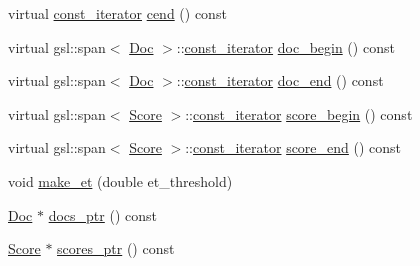 \begin{DoxyCompactItemize}
\item 
virtual \mbox{\hyperlink{structbloodhound_1_1PostingList_1_1const__iterator}{const\+\_\+iterator}} \mbox{\hyperlink{classbloodhound_1_1PostingList_a7eca0ae1f54ddc48757a4fb3c0b885ce}{cend}} () const
\item 
virtual gsl\+::span$<$ \mbox{\hyperlink{structbloodhound_1_1Doc}{Doc}} $>$\+::\mbox{\hyperlink{structbloodhound_1_1PostingList_1_1const__iterator}{const\+\_\+iterator}} \mbox{\hyperlink{classbloodhound_1_1PostingList_aac3dbe7fbf43ce93031e97b16bcfc888}{doc\+\_\+begin}} () const
\item 
virtual gsl\+::span$<$ \mbox{\hyperlink{structbloodhound_1_1Doc}{Doc}} $>$\+::\mbox{\hyperlink{structbloodhound_1_1PostingList_1_1const__iterator}{const\+\_\+iterator}} \mbox{\hyperlink{classbloodhound_1_1PostingList_aac468540b0a376d9b378a4333546245c}{doc\+\_\+end}} () const
\item 
virtual gsl\+::span$<$ \mbox{\hyperlink{structbloodhound_1_1Score}{Score}} $>$\+::\mbox{\hyperlink{structbloodhound_1_1PostingList_1_1const__iterator}{const\+\_\+iterator}} \mbox{\hyperlink{classbloodhound_1_1PostingList_aec5d5bb81622fb64d7b64416a8491456}{score\+\_\+begin}} () const
\item 
virtual gsl\+::span$<$ \mbox{\hyperlink{structbloodhound_1_1Score}{Score}} $>$\+::\mbox{\hyperlink{structbloodhound_1_1PostingList_1_1const__iterator}{const\+\_\+iterator}} \mbox{\hyperlink{classbloodhound_1_1PostingList_ae89abf9882f73f35a6e106c5a328ca6f}{score\+\_\+end}} () const
\item 
void \mbox{\hyperlink{classbloodhound_1_1PostingList_a3c9d6c5e88a7aae2642ff1d0f52160c0}{make\+\_\+et}} (double et\+\_\+threshold)
\item 
\mbox{\hyperlink{structbloodhound_1_1Doc}{Doc}} $\ast$ \mbox{\hyperlink{classbloodhound_1_1PostingList_acfca9e8ad1fd94461b56390fdd60779f}{docs\+\_\+ptr}} () const
\item 
\mbox{\hyperlink{structbloodhound_1_1Score}{Score}} $\ast$ \mbox{\hyperlink{classbloodhound_1_1PostingList_a79be9c874bb91e17ca308ae0528e9277}{scores\+\_\+ptr}} () const
\end{DoxyCompactItemize}
